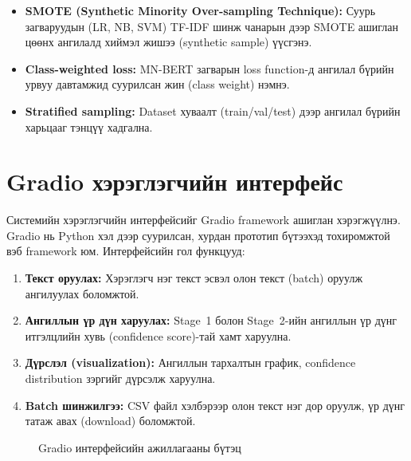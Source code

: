 \begin{itemize}
  \item \textbf{SMOTE (Synthetic Minority Over-sampling Technique):} Суурь
        загваруудын (LR, NB, SVM) TF-IDF шинж чанарын дээр SMOTE ашиглан
        цөөнх ангилалд хиймэл жишээ (synthetic sample) үүсгэнэ.
  \item \textbf{Class-weighted loss:} MN-BERT загварын loss function-д
        ангилал бүрийн урвуу давтамжид суурилсан жин (class weight) нэмнэ.
  \item \textbf{Stratified sampling:} Dataset хуваалт (train/val/test) дээр
        ангилал бүрийн харьцааг тэнцүү хадгална.
\end{itemize}

\section{Gradio хэрэглэгчийн интерфейс}

Системийн хэрэглэгчийн интерфейсийг Gradio framework ашиглан хэрэгжүүлнэ.
Gradio нь Python хэл дээр суурилсан, хурдан прототип бүтээхэд тохиромжтой
вэб framework юм. Интерфейсийн гол функцууд:

\begin{enumerate}
  \item \textbf{Текст оруулах:} Хэрэглэгч нэг текст эсвэл олон текст (batch)
        оруулж ангилуулах боломжтой.
  \item \textbf{Ангиллын үр дүн харуулах:} Stage~1 болон Stage~2-ийн
        ангиллын үр дүнг итгэлцлийн хувь (confidence score)-тай хамт харуулна.
  \item \textbf{Дүрслэл (visualization):} Ангиллын тархалтын график,
        confidence distribution зэргийг дүрсэлж харуулна.
  \item \textbf{Batch шинжилгээ:} CSV файл хэлбэрээр олон текст нэг дор
        оруулж, үр дүнг татаж авах (download) боломжтой.
\end{enumerate}

\begin{figure}[H]
  \centering
  \caption{Gradio интерфейсийн ажиллагааны бүтэц}
  \label{fig:streamlit-flow}
\end{figure}


